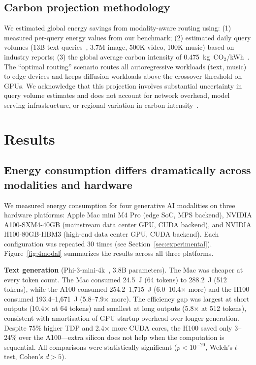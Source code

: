 \documentclass[preprint,12pt]{elsarticle}
\begin{document}
\subsection{Carbon projection methodology}

We estimated global energy savings from modality-aware routing using: (1) measured per-query energy values from our benchmark; (2) estimated daily query volumes (13B text queries~\cite{devries2023growing}, 3.7M image, 500K video, 100K music) based on industry reports; (3) the global average carbon intensity of 0.475~kg~CO$_2$/kWh~\cite{iea2024}. The ``optimal routing'' scenario routes all autoregressive workloads (text, music) to edge devices and keeps diffusion workloads above the crossover threshold on GPUs. We acknowledge that this projection involves substantial uncertainty in query volume estimates and does not account for network overhead, model serving infrastructure, or regional variation in carbon intensity~\cite{dodge2022measuring}.

\section{Results}
\label{sec:results}

\subsection{Energy consumption differs dramatically across modalities and hardware}

We measured energy consumption for four generative AI modalities on three hardware platforms: Apple Mac mini M4 Pro (edge SoC, MPS backend), NVIDIA A100-SXM4-40GB (mainstream data center GPU, CUDA backend), and NVIDIA H100-80GB-HBM3 (high-end data center GPU, CUDA backend). Each configuration was repeated 30 times (see Section~\ref{sec:experimental}). Figure~\ref{fig:4modal} summarizes the results across all three platforms.

\textbf{Text generation} (Phi-3-mini-4k~\cite{abdin2024phi3}, 3.8B parameters). The Mac was cheaper at every token count. The Mac consumed 24.5~J (64 tokens) to 288.2~J (512 tokens), while the A100 consumed 254.2--1,715~J (6.0--10.4$\times$ more) and the H100 consumed 193.4--1,671~J (5.8--7.9$\times$ more). The efficiency gap was largest at short outputs (10.4$\times$ at 64 tokens) and smallest at long outputs (5.8$\times$ at 512 tokens), consistent with amortisation of GPU startup overhead over longer generation. Despite 75\% higher TDP and 2.4$\times$ more CUDA cores, the H100 saved only 3--24\% over the A100---extra silicon does not help when the computation is sequential. All comparisons were statistically significant ($p < 10^{-20}$, Welch's $t$-test, Cohen's $d > 5$).
\end{document}
